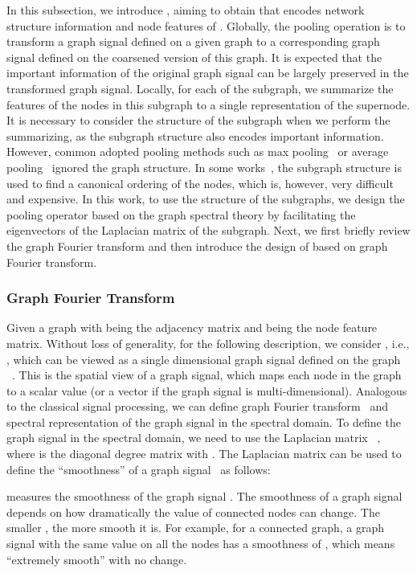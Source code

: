\documentclass[sigconf]{acmart}
\begin{document}
In this subsection, we introduce , aiming to obtain  that encodes network structure information and node features of . Globally, the pooling operation is to transform a graph signal defined on a given graph to a corresponding graph signal defined on the coarsened version of this graph. It is expected that the important information of the original graph signal can be largely preserved in the transformed graph signal. Locally, for each of the subgraph, we summarize the features of the nodes in this subgraph to a single representation of the supernode. It is necessary to consider the structure of the subgraph when we perform the summarizing, as the subgraph structure also encodes important information. However, common adopted pooling methods such as max pooling~\cite{ying2018hierarchical,defferrard2016convolutional} or average pooling~\cite{duvenaud2015convolutional} ignored the graph structure. In some works~\cite{niepert2016learning}, the subgraph structure is used to find a canonical ordering of the nodes, which is, however, very difficult and expensive. In this work, to use the structure of the subgraphs, we design the pooling operator based on the graph spectral theory by facilitating the eigenvectors of the Laplacian matrix of the subgraph. Next, we first briefly review the graph Fourier transform and then introduce the design of  based on graph Fourier transform. 

\subsubsection{Graph Fourier Transform}\label{sec:fourier}
Given a graph  with  being the adjacency matrix and  being the node feature matrix. Without loss of generality, for the following description, we consider , i.e., , which can be viewed as a single dimensional graph signal defined on the graph ~\cite{sandryhaila2013discrete}. This is the spatial view of a graph signal, which maps each node in the graph to a scalar value (or a vector if the graph signal is multi-dimensional). Analogous to the classical signal processing, we can define graph Fourier transform~\cite{shuman2013emerging} and spectral representation of the graph signal in the spectral domain. To define the graph signal in the spectral domain, we need to use the Laplacian matrix~\cite{chung1997spectral} , where  is the diagonal degree matrix with . The Laplacian matrix  can be used to define the ``smoothness'' of a graph signal~\cite{shuman2013emerging} as follows:

 measures the smoothness of the graph signal . The smoothness of a graph signal depends on how dramatically the value of connected nodes can change. The smaller , the more smooth it is. For example, for a connected graph, a graph signal with the same value on all the nodes has a smoothness of , which means ``extremely smooth'' with no change. 
\end{document}

